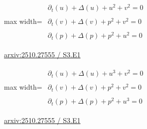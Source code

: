 \documentclass[UTF8,10pt,a4paper,fontset=mac]{ctexart}
\begin{document}
\begin{minipage}{\linewidth}\begin{center}\begin{adjustbox}{max width=\linewidth}$\displaystyle\begin{gathered}\begin{gathered}\partial_{t}(u)+\Delta(u)+u^{2}+v^{2}=0\end{gathered}\\[5pt]\begin{gathered}\partial_{t}(v)+\Delta(v)+p^{2}+v^{2}=0\end{gathered}\\[5pt]\begin{gathered}\partial_{t}(p)+\Delta(p)+p^{2}+u^{2}=0\end{gathered}\end{gathered}$\end{adjustbox}\end{center}{\small\href{https://arxiv.org/html/2510.27555#S3.E1}{arxiv:2510.27555 / S3.E1}}\par\end{minipage}\par\vspace{6mm}

\begin{minipage}{\linewidth}\begin{center}\begin{adjustbox}{max width=\linewidth}$\displaystyle\begin{gathered}\begin{gathered}\partial_{t}(u)+\Delta(u)+u^{3}+v^{2}=0\end{gathered}\\[5pt]\begin{gathered}\partial_{t}(v)+\Delta(v)+p^{2}+v^{2}=0\end{gathered}\\[5pt]\begin{gathered}\partial_{t}(p)+\Delta(p)+p^{2}+u^{3}=0\end{gathered}\end{gathered}$\end{adjustbox}\end{center}{\small\href{https://arxiv.org/html/2510.27555#S3.E1}{arxiv:2510.27555 / S3.E1}}\par\end{minipage}\par\vspace{6mm}
\end{document}
